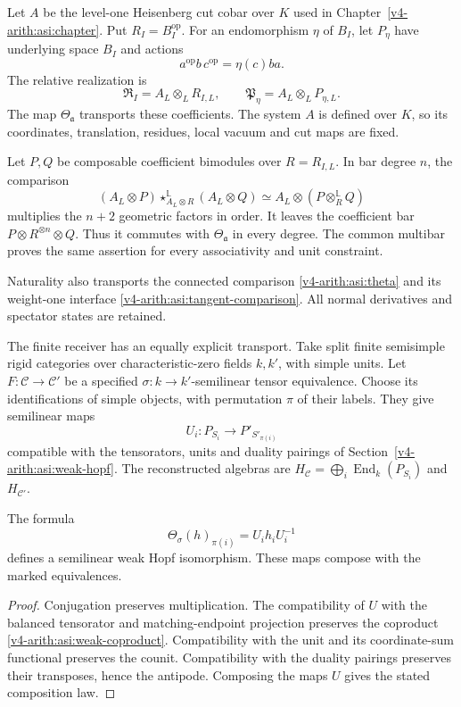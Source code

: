Let \(A\) be the level-one Heisenberg cut cobar over \(K\)
used in Chapter~\ref{v4-arith:asi:chapter}. Put \(R_I=B_I^{\mathrm{op}}\).
For an endomorphism \(\eta\) of \(B_I\), let \(P_\eta\) have
underlying space \(B_I\) and actions
\[
 a^{\mathrm{op}}b\,c^{\mathrm{op}}=\eta(c)ba.
\]
The relative realization is
\[
 \mathfrak R_I=A_L\otimes_LR_{I,L},\qquad
 \mathfrak P_\eta=A_L\otimes_LP_{\eta,L}.
\]
The map \(\Theta_{\mathfrak a}\) transports these coefficients.
The system \(A\) is defined over \(K\), so its coordinates,
translation, residues, local vacuum and cut maps are fixed.

Let \(P,Q\) be composable coefficient bimodules over
\(R=R_{I,L}\). In bar degree \(n\), the comparison
\[
 (A_L\otimes P)\star^{\mathbb L}_{A_L\otimes R}
                  (A_L\otimes Q)
 \simeq A_L\otimes(P\otimes_R^{\mathbb L}Q)
\]
multiplies the \(n+2\) geometric factors in order.
It leaves the coefficient bar
\(P\otimes R^{\otimes n}\otimes Q\).
Thus it commutes with \(\Theta_{\mathfrak a}\) in every degree.
The common multibar proves the same assertion for every
associativity and unit constraint.

Naturality also transports the connected comparison
\eqref{v4-arith:asi:theta} and its weight-one interface
\eqref{v4-arith:asi:tangent-comparison}.
All normal derivatives and spectator states are retained.

The finite receiver has an equally explicit transport.
Take split finite semisimple rigid categories over
characteristic-zero fields \(k,k'\), with simple units.
Let \(F:\mathcal C\to\mathcal C'\) be a specified
\(\sigma:k\to k'\)-semilinear tensor equivalence.
Choose its identifications of simple objects, with permutation
\(\pi\) of their labels. They give semilinear maps
\[
 U_i:P_{S_i}\longrightarrow P'_{S'_{\pi(i)}}
\]
compatible with the tensorators, units and duality pairings of
Section~\ref{v4-arith:asi:weak-hopf}.
The reconstructed algebras are
\(H_{\mathcal C}=\bigoplus_i\operatorname{End}_k(P_{S_i})\)
and \(H_{\mathcal C'}\).

\begin{proposition}\label{v4-arith:at:weak-transport}
The formula
\[
 \Theta_\sigma(h)_{\pi(i)}=U_i h_iU_i^{-1}
\]
defines a semilinear weak Hopf isomorphism.
These maps compose with the marked equivalences.
\end{proposition}
\begin{proof}
Conjugation preserves multiplication.
The compatibility of \(U\) with the balanced tensorator and
matching-endpoint projection preserves the coproduct
\eqref{v4-arith:asi:weak-coproduct}.
Compatibility with the unit and its coordinate-sum functional
preserves the counit. Compatibility with the duality pairings
preserves their transposes, hence the antipode.
Composing the maps \(U\) gives the stated composition law.
\end{proof}

